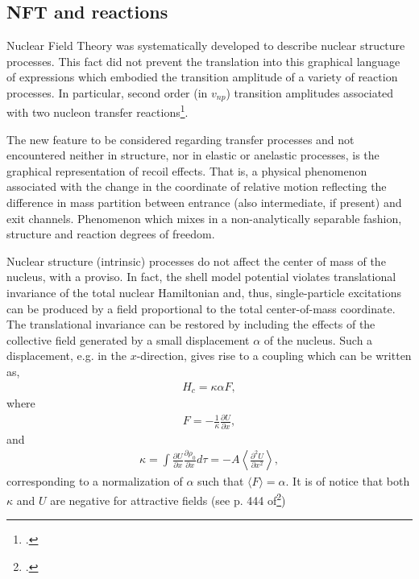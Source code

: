 \begin{subappendices}
\section{NFT and reactions}\label{App1.D}
Nuclear Field Theory was systematically developed to describe nuclear structure processes. This fact did not prevent the translation into this graphical language  of expressions which embodied the transition amplitude of a variety of reaction processes. In particular, second order (in $v_{np}$) transition amplitudes associated with two nucleon transfer reactions\footnote{\cite{Broglia:75,Broglia:04a}.}.




The new feature to be considered regarding transfer processes and not encountered neither in structure, nor in elastic or anelastic processes, is the graphical representation of recoil effects. That is, a physical phenomenon associated with the change in the coordinate of relative motion reflecting the difference in mass partition between entrance (also intermediate, if present) and exit channels. Phenomenon which mixes in a non-analytically separable fashion, structure and reaction degrees of freedom.

Nuclear structure (intrinsic) processes do not affect the center of mass of the nucleus, with a proviso. In fact, the shell model potential violates translational invariance of the total nuclear Hamiltonian and, thus, single-particle excitations can be produced by a field proportional to the total center-of-mass coordinate. The translational invariance can be restored by including  the effects of the collective field generated by a small displacement $\alpha$ of the nucleus. Such a displacement, e.g. in the $x$-direction, gives rise to a coupling which can be written as,
\begin{align}\label{eq1.D.1}
H_{c}=\kappa\alpha F,
\end{align}
where 
\begin{align}\label{eq1.D.2}
F=-\frac{1}{\kappa}\frac{\partial U}{\partial x},
\end{align}
and
\begin{align}\label{eq1.D.3}
\kappa=\int\frac{\partial U}{\partial x}\frac{\partial \rho_0}{\partial x}d\tau=-A\left\langle\frac{\partial^2U}{\partial x^2}\right\rangle,
\end{align}
corresponding to a normalization of $\alpha$ such that $\langle F\rangle=\alpha$. It is of notice that both $\kappa$ and $U$ are negative for attractive fields (see p. 444 of\footnote{\cite{Bohr:75}.})



\end{subappendices}
